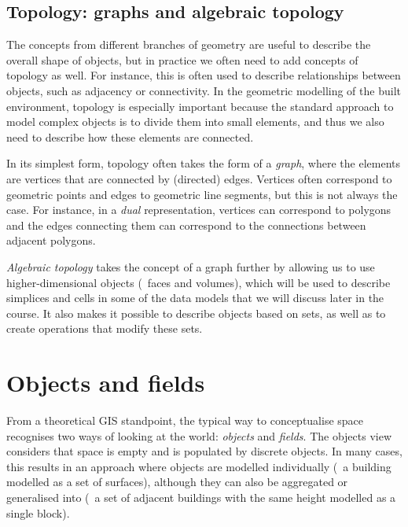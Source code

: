 \subsection{Topology: graphs and algebraic topology}

The concepts from different branches of geometry are useful to describe the overall shape of objects, but in practice we often need to add concepts of topology as well.
For instance, this is often used to describe relationships between objects, such as adjacency or connectivity.
In the geometric modelling of the built environment, topology is especially important because the standard approach to model complex objects is to divide them into small elements, and thus we also need to describe how these elements are connected.

In its simplest form, topology often takes the form of a \emph{graph}, where the elements are vertices that are connected by (directed) edges.
Vertices often correspond to geometric points and edges to geometric line segments, but this is not always the case.
For instance, in a \emph{dual} representation, vertices can correspond to polygons and the edges connecting them can correspond to the connections between adjacent polygons.

\emph{Algebraic topology} takes the concept of a graph further by allowing us to use higher-dimensional objects (\eg\ faces and volumes), which will be used to describe simplices and cells in some of the data models that we will discuss later in the course.
It also makes it possible to describe objects based on sets, as well as to create operations that modify these sets.

\section{Objects and fields}

From a theoretical GIS standpoint, the typical way to conceptualise space recognises two ways of looking at the world: \emph{objects} and \emph{fields}.
The objects view considers that space is empty and is populated by discrete objects.
In many cases, this results in an approach where objects are modelled individually (\eg\ a building modelled as a set of surfaces), although they can also be aggregated or generalised into (\eg\ a set of adjacent buildings with the same height modelled as a single block).

